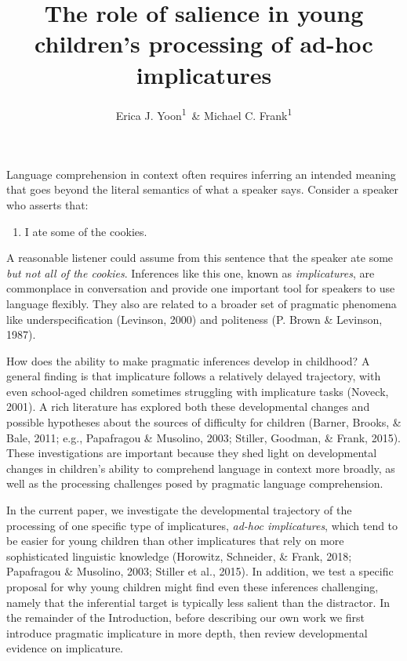 \documentclass[man]{apa6}
\title{The role of salience in young children's processing of ad-hoc
implicatures}
\author{Erica J. Yoon\textsuperscript{1}~\& Michael C. Frank\textsuperscript{1}}
\affiliation{
    \vspace{0.5cm}
          \textsuperscript{1} Stanford University  }
\providecommand{\tightlist}{%
  \setlength{\itemsep}{0pt}\setlength{\parskip}{0pt}}
\begin{document}
\maketitle

\setcounter{secnumdepth}{0}



Language comprehension in context often requires inferring an intended
meaning that goes beyond the literal semantics of what a speaker says.
Consider a speaker who asserts that:

\begin{enumerate}
\def\labelenumi{(\arabic{enumi})}
\tightlist
\item
  I ate some of the cookies.
\end{enumerate}

\noindent A reasonable listener could assume from this sentence that the
speaker ate some \emph{but not all of the cookies}. Inferences like this
one, known as \emph{implicatures}, are commonplace in conversation and
provide one important tool for speakers to use language flexibly. They
also are related to a broader set of pragmatic phenomena like
underspecification (Levinson, 2000) and politeness (P. Brown \&
Levinson, 1987).

How does the ability to make pragmatic inferences develop in childhood?
A general finding is that implicature follows a relatively delayed
trajectory, with even school-aged children sometimes struggling with
implicature tasks (Noveck, 2001). A rich literature has explored both
these developmental changes and possible hypotheses about the sources of
difficulty for children (Barner, Brooks, \& Bale, 2011; e.g., Papafragou
\& Musolino, 2003; Stiller, Goodman, \& Frank, 2015). These
investigations are important because they shed light on developmental
changes in children's ability to comprehend language in context more
broadly, as well as the processing challenges posed by pragmatic
language comprehension.

In the current paper, we investigate the developmental trajectory of the
processing of one specific type of implicatures, \emph{ad-hoc
implicatures}, which tend to be easier for young children than other
implicatures that rely on more sophisticated linguistic knowledge
(Horowitz, Schneider, \& Frank, 2018; Papafragou \& Musolino, 2003;
Stiller et al., 2015). In addition, we test a specific proposal for why
young children might find even these inferences challenging, namely that
the inferential target is typically less salient than the distractor. In
the remainder of the Introduction, before describing our own work we
first introduce pragmatic implicature in more depth, then review
developmental evidence on implicature.
\end{document}
